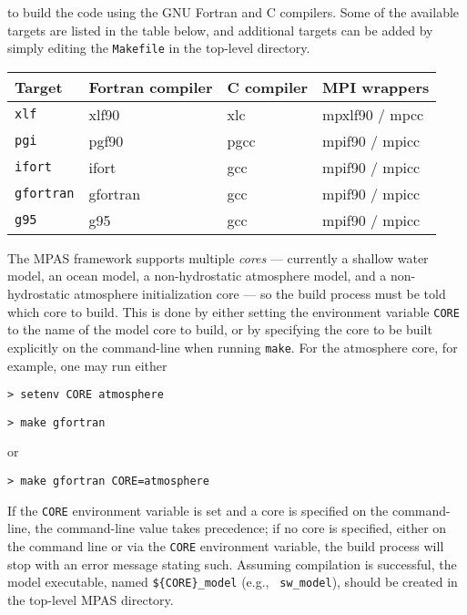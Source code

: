 \noindent to build the code using the GNU Fortran and C compilers. Some of the
available targets are listed in the table below, and additional targets can be
added by simply editing the {\tt Makefile} in the top-level directory.

\vspace{12pt}
\begin{longtable}{| l | l | l | l |}
\hline
Target & Fortran compiler & C compiler & MPI wrappers \\ \hline \hline
{\tt xlf} & xlf90 & xlc & mpxlf90 / mpcc \\ \hline
{\tt pgi} & pgf90 & pgcc & mpif90 / mpicc \\ \hline
{\tt ifort} & ifort & gcc & mpif90 / mpicc \\ \hline
{\tt gfortran} & gfortran & gcc & mpif90 / mpicc \\ \hline
{\tt g95} & g95 & gcc & mpif90 / mpicc \\ \hline
\end{longtable}
\vspace{12pt}

The MPAS framework supports multiple {\em cores} --- currently a shallow water
model, an ocean model, a non-hydrostatic atmosphere model, and a non-hydrostatic
atmosphere initialization core --- so the build process must be told which core
to build. This is done by either setting the environment variable {\tt CORE} to
the name of the model core to build, or by specifying the core to be built
explicitly on the command-line when running {\tt make}. For the atmosphere
core, for example, one may run either

\vspace{12pt}
{\tt > setenv CORE atmosphere}

{\tt > make gfortran}
\vspace{12pt}

\noindent or

\vspace{12pt}
{\tt > make gfortran CORE=atmosphere}
\vspace{12pt}

If the {\tt CORE} environment variable is set and a core is specified on the
command-line, the command-line value takes precedence; if no core is specified,
either on the command line or via the {\tt CORE} environment variable, the build
process will stop with an error message stating such.  Assuming compilation is
successful, the model executable, named {\tt \$\{CORE\}\_model} (e.g., {\tt
sw\_model}), should be created in the top-level MPAS directory.

